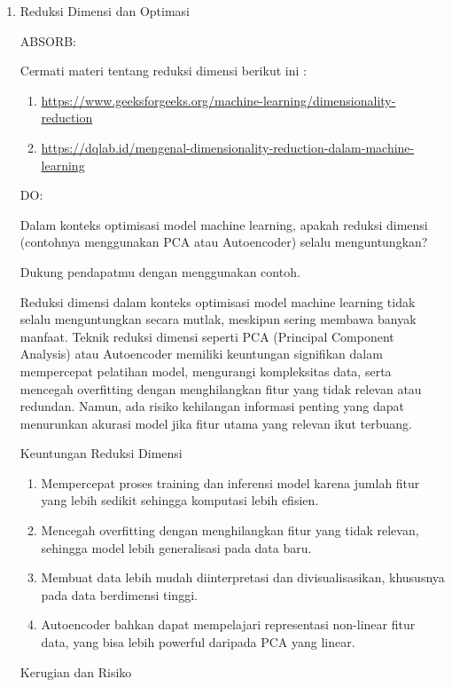 \documentclass[a4paper]{article}
\begin{document}
\pagestyle{empty}

\begin{enumerate}[itemsep=1em,leftmargin=*]
  \item Reduksi Dimensi dan Optimasi
  
  ABSORB:

  Cermati materi tentang reduksi dimensi berikut ini :
  \begin{enumerate}
    \item \url{https://www.geeksforgeeks.org/machine-learning/dimensionality-reduction}
    \item \url{https://dqlab.id/mengenal-dimensionality-reduction-dalam-machine-learning}
  \end{enumerate}

  DO:

  Dalam konteks optimisasi model machine learning, apakah reduksi dimensi (contohnya menggunakan PCA atau Autoencoder) selalu menguntungkan?
  
  Dukung pendapatmu dengan menggunakan contoh.

  Reduksi dimensi dalam konteks optimisasi model machine learning tidak selalu menguntungkan secara mutlak, meskipun sering membawa banyak manfaat. Teknik reduksi dimensi seperti PCA (Principal Component Analysis) atau Autoencoder memiliki keuntungan signifikan dalam mempercepat pelatihan model, mengurangi kompleksitas data, serta mencegah overfitting dengan menghilangkan fitur yang tidak relevan atau redundan. Namun, ada risiko kehilangan informasi penting yang dapat menurunkan akurasi model jika fitur utama yang relevan ikut terbuang.

  Keuntungan Reduksi Dimensi

  \begin{enumerate}
    \item Mempercepat proses training dan inferensi model karena jumlah fitur yang lebih sedikit sehingga komputasi lebih efisien.
    \item Mencegah overfitting dengan menghilangkan fitur yang tidak relevan, sehingga model lebih generalisasi pada data baru.
    \item Membuat data lebih mudah diinterpretasi dan divisualisasikan, khususnya pada data berdimensi tinggi.
    \item Autoencoder bahkan dapat mempelajari representasi non-linear fitur data, yang bisa lebih powerful daripada PCA yang linear.
  \end{enumerate}

  Kerugian dan Risiko


\end{enumerate}
\end{document}
